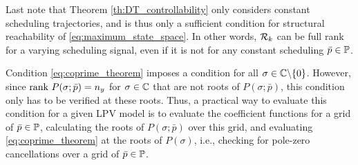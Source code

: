 Last note that Theorem \ref{th:DT_controllability} only considers constant scheduling trajectories, and is thus only a sufficient condition for structural reachability of \eqref{eq:maximum_state_space}. In other words, $\mathcal{R}_k$ can be full rank for a varying scheduling signal, even if it is not for any constant scheduling $\bar{p}\in\mathbb{P}$.

Condition \eqref{eq:coprime_theorem} imposes a condition for all $\sigma \in \mathbb{C} \backslash \{0\}$. However, since $\rank\ P(\sigma;\bar{p}) = n_y$ for $\sigma \in \mathbb{C}$ that are not roots of $P(\sigma;\bar{p})$, this condition only has to be verified at these roots. Thus, a practical way to evaluate this condition for a given LPV model is to evaluate the coefficient functions for a grid of $\bar{p}\in\mathbb{P}$, calculating the roots of $P(\sigma;\bar{p})$ over this grid, and evaluating \eqref{eq:coprime_theorem} at the roots of $P(\sigma)$, i.e., checking for pole-zero cancellations over a grid of $\bar{p}\in\mathbb{P}$.

